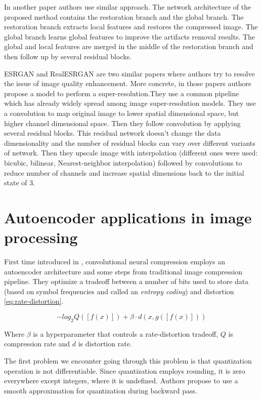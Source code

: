 In another paper \cite{li_learning_2020} authors use similar approach. The network architecture of the proposed method contains the restoration branch and the global branch. The restoration branch extracts local features and restores the compressed image. The global branch learns global features to improve the artifacts removal results. The global and local features are merged in the middle of the restoration branch and then follow up by several residual blocks.

ESRGAN \cite{Wang_Yu_Wu_Gu_Liu_Dong_Qiao_Loy_2019} and RealESRGAN \cite{Wang_Xie_Dong_Shan_2021} are two similar papers where authors try to resolve the issue of image quality enhancement. More concrete, in those papers authors propose a model to perform a super-resolution.They use a common pipeline which has already widely spread among image super-resolution models. They use a convolution to map original image to lower spatial dimensional space, but higher channel dimensional space. Then they follow convolution by applying several residual blocks. This residual network doesn't change the data dimensionality and the number of residual blocks can vary over different variants of network. Then they upscale image with interpolation (different ones were used: bicubic, bilinear, Nearest-neighbor interpolation) followed by convolutions to reduce number of channels and increase spatial dimensions back to the initial state of 3.

\section{Autoencoder applications in image processing}

First time introduced in \cite{toderici_full_2017}, convolutional neural compression employs an autoencoder architecture and some steps from traditional image compression pipeline. They optimize a tradeoff between a number of bits used to store data (based on symbol frequencies and called an \textit{entropy coding}) and distortion \ref{eq:rate-distortion}.

\begin{equation}
    \label{eq:rate-distortion}
    − log_2 Q ([f (x)]) + \beta · d (x, g([f (x)]))
\end{equation}

Where $\beta$ is a hyperparameter that controls a rate-distortion tradeoff, $Q$ is compression rate and $d$ is distortion rate.

The first problem we encounter going through this problem is that quantization operation is not differentiable. Since quantization employs rounding, it is zero everywhere except integers, where it is undefined. Authors propose to use a smooth approximation for quantization during backward pass.

